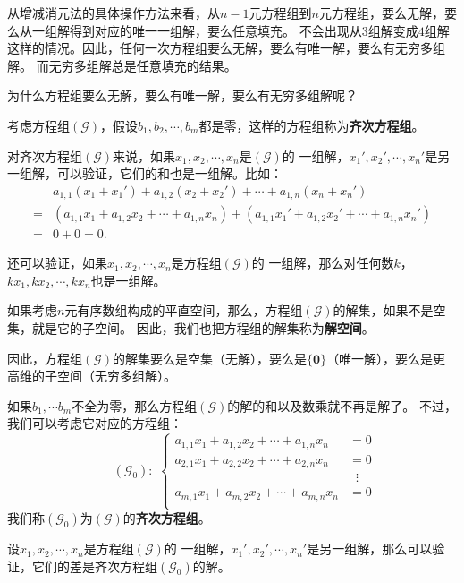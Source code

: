 \documentclass[12pt,UTF8]{ctexbook}
\theoremstyle{definition}
\theoremstyle{plain}
\begin{document}
从增减消元法的具体操作方法来看，从$n-1$元方程组到$n$元方程组，要么无解，要么从一组解得到对应的唯一一组解，要么任意填充。
不会出现从$3$组解变成$4$组解这样的情况。因此，任何一次方程组要么无解，要么有唯一解，要么有无穷多组解。
而无穷多组解总是任意填充的结果。

为什么方程组要么无解，要么有唯一解，要么有无穷多组解呢？

考虑方程组$(\mathcal{G})$，假设$b_1, b_2,\cdots, b_m$都是零，这样的方程组称为\textbf{齐次方程组}。

对齐次方程组$(\mathcal{G})$来说，如果$x_1, x_2, \cdots , x_n$是$(\mathcal{G})$的
一组解，$x_1', x_2', \cdots , x_n'$是另一组解，可以验证，它们的和也是一组解。比如：
\begin{align*}
     & a_{1,1} (x_1 + x_1') + a_{1,2} (x_2 + x_2') + \cdots + a_{1,n} (x_n + x_n') \\
    =& \left(a_{1,1} x_1 + a_{1,2} x_2 + \cdots + a_{1,n} x_n\right) + \left(a_{1,1} x_1' + a_{1,2} x_2' + \cdots + a_{1,n} x_n'\right) \\
    =& 0 + 0 = 0.
\end{align*}

还可以验证，如果$x_1, x_2, \cdots , x_n$是方程组$(\mathcal{G})$的
一组解，那么对任何数$k$，$kx_1, kx_2, \cdots , kx_n$也是一组解。

如果考虑$n$元有序数组构成的平直空间，那么，方程组$(\mathcal{G})$的解集，如果不是空集，就是它的子空间。
因此，我们也把方程组的解集称为\textbf{解空间}。

因此，方程组$(\mathcal{G})$的解集要么是空集（无解），要么是$\{\mathbf{0}\}$（唯一解），要么是更高维的子空间（无穷多组解）。

如果$b_1, \cdots b_m$不全为零，那么方程组$(\mathcal{G})$的解的和以及数乘就不再是解了。
不过，我们可以考虑它对应的方程组：
$$
\qquad (\mathcal{G}_0):\,\,
\left\{
    \begin{aligned}
        a_{1,1} x_1 + a_{1,2} x_2 + \cdots + a_{1,n} x_n &= 0 \\
        a_{2,1} x_1 + a_{2,2} x_2 + \cdots + a_{2,n} x_n &= 0 \\
        &\;\;\vdots \\
        a_{m,1} x_1 + a_{m,2} x_2 + \cdots + a_{m,n} x_n &= 0 \\
    \end{aligned}
\right.
$$
我们称$(\mathcal{G}_0)$为$(\mathcal{G})$的\textbf{齐次方程组}。

设$x_1, x_2, \cdots , x_n$是方程组$(\mathcal{G})$的
一组解，$x_1', x_2', \cdots , x_n'$是另一组解，那么可以验证，它们的差是齐次方程组$(\mathcal{G}_0)$的解。
\end{document}
